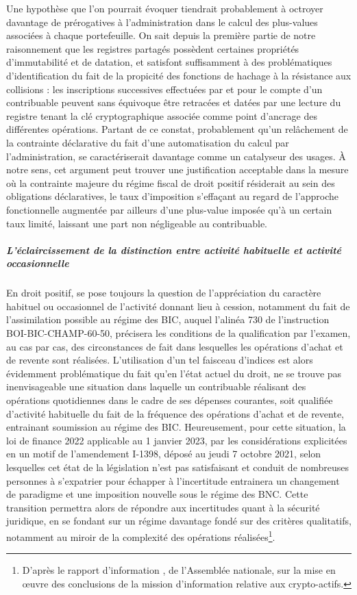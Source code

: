 {Une hypothèse que l'on pourrait évoquer tiendrait probablement à octroyer davantage de prérogatives à l'administration dans le calcul des plus-values associées à chaque portefeuille. On sait depuis la première partie de notre raisonnement que les registres partagés possèdent certaines propriétés d'immutabilité et de datation, et satisfont suffisamment à des problématiques d'identification du fait de la propicité des fonctions de hachage à la résistance aux collisions : les inscriptions successives effectuées par et pour le compte d'un contribuable peuvent sans équivoque être retracées et datées par une lecture du registre tenant la clé cryptographique associée comme point d'ancrage des différentes opérations. Partant de ce constat, probablement qu'un relâchement de la contrainte déclarative du fait d'une automatisation du calcul par l'administration, se caractériserait davantage comme un catalyseur des usages. À notre sens, cet argument peut trouver une justification acceptable dans la mesure où la contrainte majeure du régime fiscal de droit positif résiderait au sein des obligations déclaratives, le taux d'imposition s'effaçant au regard de l'approche fonctionnelle augmentée par ailleurs d'une plus-value imposée qu'à un certain taux limité, laissant une part non négligeable au contribuable.

\subparagraph{L'éclaircissement de la distinction entre activité habituelle et activité occasionnelle}

En droit positif, se pose toujours la question de l'appréciation du caractère habituel ou occasionnel de l'activité donnant lieu à cession, notamment du fait de l'assimilation possible au régime des BIC, auquel l'alinéa 730 de l'instruction BOI-BIC-CHAMP-60-50, précisera les conditions de la qualification par l'examen, au cas par cas, des circonstances de fait dans lesquelles les opérations d'achat et de revente sont réalisées. L'utilisation d'un tel faisceau d'indices est alors évidemment problématique du fait qu'en l'état actuel du droit, ne se trouve pas inenvisageable une situation dans laquelle un contribuable réalisant des opérations quotidiennes dans le cadre de ses dépenses courantes, soit qualifiée d'activité habituelle du fait de la fréquence des opérations d'achat et de revente, entrainant soumission au régime des BIC. Heureusement, pour cette situation, la loi de finance 2022 applicable au 1 janvier 2023, par les considérations explicitées en un motif de l'amendement \no I-1398, déposé au jeudi 7 octobre 2021, selon lesquelles \og cet état de la législation n'est pas satisfaisant et conduit de nombreuses personnes à s'expatrier pour échapper à l'incertitude\fg{} entrainera un changement de paradigme et une imposition nouvelle sous le régime des BNC. Cette transition permettra alors de répondre aux incertitudes quant à la sécurité juridique, en se fondant sur un régime davantage fondé sur des critères qualitatifs, notamment au miroir de la complexité des opérations réalisées\footnote{D'après le rapport d'information , de l'Assemblée nationale, sur la mise en \oe{}uvre des conclusions de la mission d'information relative aux crypto-actifs.}.

}
